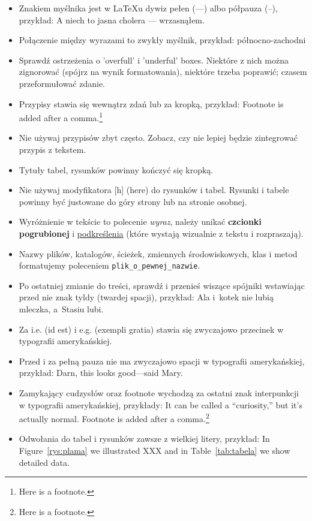 \begin{itemize}
\item Znakiem myślnika jest w LaTeXu dywiz pełen (---) albo półpauza (--), przykład:
  A niech to jasna cholera --- wrzasnąłem.

\item Połączenie między wyrazami to zwykły myślnik, przykład:   północno-zachodni

\item Sprawdź ostrzeżenia o 'overfull' i 'underful' boxes. Niektóre z nich można zignorować (spójrz
  na wynik formatowania), niektóre trzeba poprawić; czasem przeformułować zdanie.

\item Przypisy stawia się wewnątrz zdań lub za kropką, przykład:
  Footnote is added after a comma.\footnote{Here is a footnote.}

\item Nie używaj przypisów zbyt często. Zobacz, czy nie lepiej będzie zintegrować przypis z tekstem.

\item Tytuły tabel, rysunków powinny kończyć się kropką.

\item Nie używaj modyfikatora [h] (here) do rysunków i tabel. Rysunki i tabele powinny być
  justowane do góry strony lub na stronie osobnej.

\item Wyróżnienie w tekście to polecenie \emph{wyraz}, należy unikać \textbf{czcionki pogrubionej} i \underline{podkreślenia} (które wystają wizualnie z tekstu i rozpraszają).

\item Nazwy plików, katalogów, ścieżek, zmiennych środowiskowych, klas i metod formatujemy poleceniem
  \texttt{plik\_o\_pewnej\_nazwie}.

\item Po ostatniej zmianie do treści, sprawdź i przenieś wiszące spójniki wstawiając przed nie znak
  tyldy (twardej spacji), przykład:
  Ala i~kotek nie lubią mleczka, a~Stasiu lubi.
  
\item Za i.e. (id est) i e.g. (exempli gratia) stawia się zwyczajowo przecinek w typografii amerykańskiej.

\item Przed i za pełną pauza nie ma zwyczajowo spacji w typografii amerykańskiej, przykład:
  Darn, this looks good---said Mary.

\item Zamykający cudzysłów oraz footnote wychodzą za ostatni znak interpunkcji w typografii 
  amerykańskiej, przykłady:
  It can be called a ``curiosity,'' but it's actually normal.
  Footnote is added after a comma.\footnote{Here is a footnote.}

\item Odwołania do tabel i rysunków zawsze z wielkiej litery, przykład:
  In Figure~\ref{rys:plama} we illustrated XXX and in Table~\ref{tab:tabela} we show detailed data.
  
\end{itemize}


